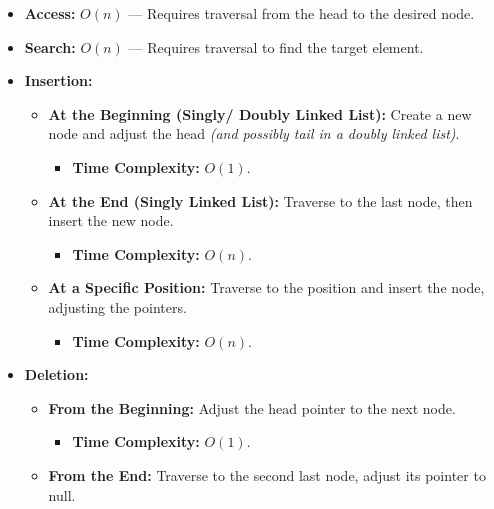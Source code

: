 \documentclass[
  letterpaper,
  DIV=11,
  numbers=noendperiod]{scrreprt}
\providecommand{\tightlist}{%
  \setlength{\itemsep}{0pt}\setlength{\parskip}{0pt}}
\begin{document}
\begin{itemize}
\item
  \textbf{Access:} \(O(n)\) --- Requires traversal from the head to the
  desired node.
\item
  \textbf{Search:} \(O(n)\) --- Requires traversal to find the target
  element.
\item
  \textbf{Insertion:}

  \begin{itemize}
  \tightlist
  \item
    \textbf{At the Beginning (Singly/ Doubly Linked List):} Create a new
    node and adjust the head \emph{(and possibly tail in a doubly linked
    list)}.

    \begin{itemize}
    \tightlist
    \item
      \textbf{Time Complexity:} \(O(1)\).
    \end{itemize}
  \item
    \textbf{At the End (Singly Linked List):} Traverse to the last node,
    then insert the new node.

    \begin{itemize}
    \tightlist
    \item
      \textbf{Time Complexity:} \(O(n)\).
    \end{itemize}
  \item
    \textbf{At a Specific Position:} Traverse to the position and insert
    the node, adjusting the pointers.

    \begin{itemize}
    \tightlist
    \item
      \textbf{Time Complexity:} \(O(n)\).
    \end{itemize}
  \end{itemize}
\item
  \textbf{Deletion:}

  \begin{itemize}
  \tightlist
  \item
    \textbf{From the Beginning:} Adjust the head pointer to the next
    node.

    \begin{itemize}
    \tightlist
    \item
      \textbf{Time Complexity:} \(O(1)\).
    \end{itemize}
  \item
    \textbf{From the End:} Traverse to the second last node, adjust its
    pointer to null.


\end{itemize}
\end{itemize}
\end{document}
